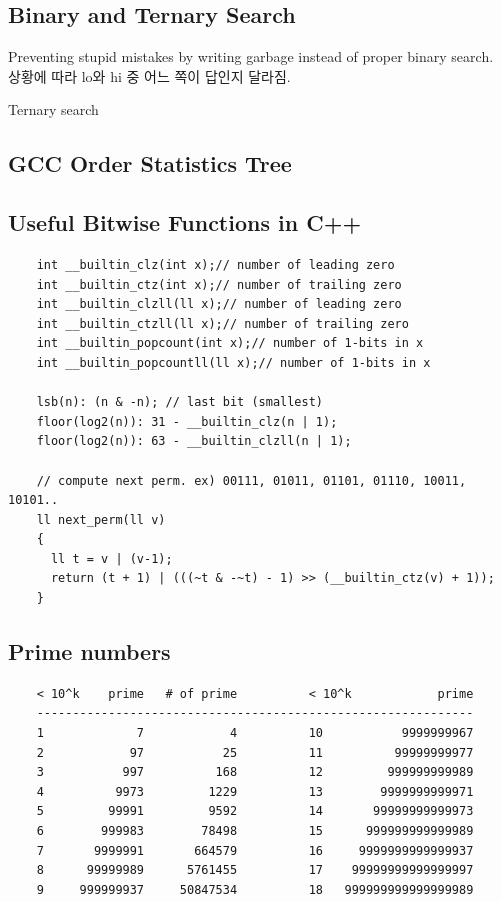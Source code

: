 \documentclass[landscape,8pt]{article}
\begin{document}
\begin{multicols}{2}
  \subsection{Binary and Ternary Search}
    Preventing stupid mistakes by writing garbage instead of proper binary search.\\
    상황에 따라 lo와 hi 중 어느 쪽이 답인지 달라짐.
    
    Ternary search
    
  \subsection{GCC Order Statistics Tree}
    
  \subsection{Useful Bitwise Functions in C++}
  \begin{verbatim}
    int __builtin_clz(int x);// number of leading zero
    int __builtin_ctz(int x);// number of trailing zero
    int __builtin_clzll(ll x);// number of leading zero
    int __builtin_ctzll(ll x);// number of trailing zero
    int __builtin_popcount(int x);// number of 1-bits in x
    int __builtin_popcountll(ll x);// number of 1-bits in x

    lsb(n): (n & -n); // last bit (smallest)
    floor(log2(n)): 31 - __builtin_clz(n | 1);
    floor(log2(n)): 63 - __builtin_clzll(n | 1);

    // compute next perm. ex) 00111, 01011, 01101, 01110, 10011, 10101..
    ll next_perm(ll v)
    {
      ll t = v | (v-1);
      return (t + 1) | (((~t & -~t) - 1) >> (__builtin_ctz(v) + 1));
    }
  \end{verbatim}
  \subsection{Prime numbers}
  \begin{verbatim}
    < 10^k    prime   # of prime          < 10^k            prime
    -------------------------------------------------------------
    1             7            4          10           9999999967
    2            97           25          11          99999999977
    3           997          168          12         999999999989
    4          9973         1229          13        9999999999971
    5         99991         9592          14       99999999999973
    6        999983        78498          15      999999999999989
    7       9999991       664579          16     9999999999999937
    8      99999989      5761455          17    99999999999999997
    9     999999937     50847534          18   999999999999999989
  \end{verbatim}

\end{multicols}
\end{document}
